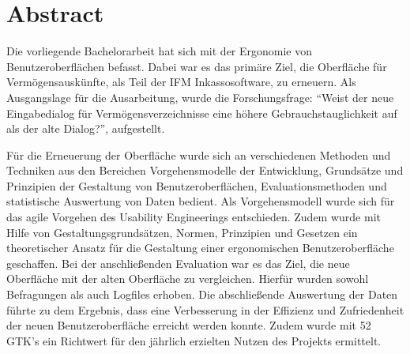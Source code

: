 \section{Abstract}
Die vorliegende Bachelorarbeit hat sich mit der Ergonomie von Benutzeroberflächen befasst. Dabei war es das primäre Ziel, die Oberfläche für Vermögensauskünfte, als Teil der IFM Inkassosoftware, zu erneuern. Als Ausgangslage für die Ausarbeitung, wurde die Forschungsfrage: \enquote{Weist der neue Eingabedialog für Vermögensverzeichnisse eine höhere Gebrauchstauglichkeit auf als der alte Dialog?}, aufgestellt.

Für die Erneuerung der Oberfläche wurde sich an verschiedenen Methoden und Techniken aus den Bereichen Vorgehensmodelle der Entwicklung, Grundsätze und Prinzipien der Gestaltung von Benutzeroberflächen, Evaluationsmethoden und statistische Auswertung von Daten bedient. Als Vorgehensmodell wurde sich für das agile Vorgehen des Usability Engineerings entschieden. Zudem wurde mit Hilfe von Gestaltungsgrundsätzen, Normen, Prinzipien und Gesetzen ein theoretischer Ansatz für die Gestaltung einer ergonomischen Benutzeroberfläche geschaffen. Bei der anschließenden Evaluation war es das Ziel, die neue Oberfläche mit der alten Oberfläche zu vergleichen. Hierfür wurden sowohl Befragungen als auch Logfiles erhoben. Die abschließende Auswertung der Daten führte zu dem Ergebnis, dass eine Verbesserung in der Effizienz und Zufriedenheit der neuen Benutzeroberfläche erreicht werden konnte. Zudem wurde mit 52 GTK's ein Richtwert für den jährlich erzielten Nutzen des Projekts ermittelt.
